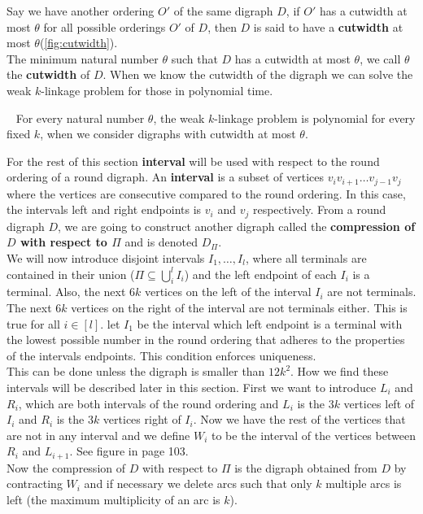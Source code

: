 Say we have another ordering $O'$ of the same digraph $D$, if $O'$ has a cutwidth at most $\theta$ for all possible orderings $O'$ of $D$, then $D$ is said to have a \textbf{cutwidth} at most $\theta$(\autoref{fig:cutwidth}).  \\
The minimum natural number $\theta$ such that $D$ has a cutwidth at most $\theta$, we call $\theta$ the \textbf{cutwidth} of $D$.
When we know the cutwidth of the digraph we can solve the weak $k$-linkage problem for those in polynomial time.
\begin{thm}~\cite{bangJGT77}
    For every natural number $\theta$, the weak $k$-linkage problem is polynomial for every fixed $k$, when we consider digraphs with cutwidth at most $\theta$.
    \label{thm:cutwidthklink}
\end{thm}
For the rest of this section  \textbf{interval} will be used with respect to the round ordering of a round digraph. 
An \textbf{interval} is a subset of vertices $v_iv_{i+1}\dots v_{j-1}v_j$ where the vertices are consecutive compared to the round ordering. 
In this case, the intervals left and right endpoints is $v_i$ and $v_j$ respectively.
From a round digraph $D$, we are going to construct another digraph called the \textbf{compression of $D$ with respect to $\Pi$} and is denoted $D_{\Pi}$. \\
We will now introduce disjoint intervals $I_1,\dots ,I_l$, where all terminals are contained in their union ($\Pi \subseteq \bigcup_i ^l I_i$) and the left endpoint of each $I_i$ is a terminal.
Also, the next $6k$ vertices on the left of the interval $I_i$ are not terminals.
The next $6k$ vertices on the right of the interval are not terminals either. 
This is true for all $i\in [l]$. 
let $I_1$ be the interval which left endpoint is a terminal with the lowest possible number in the round ordering that adheres to the properties of the intervals endpoints.
This condition enforces uniqueness.\\
This can be done unless the digraph is smaller than $12k^2$.
How we find these intervals will be described later in this section.
First we want to introduce $L_i$ and $R_i$, which are both intervals of the round ordering and $L_i$ is the $3k$ vertices left of $I_i$ and $R_i$ is the $3k$ vertices right of $I_i$.
Now we have the rest of the vertices that are not in any interval and we define $W_i$ to be the interval of the vertices between $R_i$ and $L_{i+1}$.
See figure in \cite{bangJGT77} page 103.\\
Now the compression of $D$ with respect to $\Pi$ is the digraph obtained from $D$ by contracting $W_i$ and if necessary we delete arcs such that only $k$ multiple arcs is left (the maximum multiplicity of an arc is $k$).

